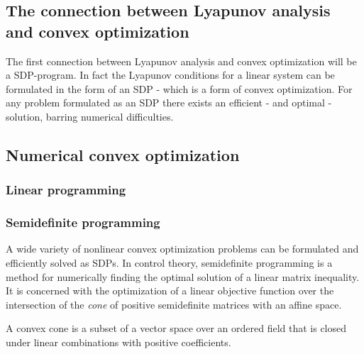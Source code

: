 \subsection{The connection between Lyapunov analysis and convex optimization}

The first connection between Lyapunov analysis and convex optimization will be a
\ac{SDP}-program. In fact the Lyapunov conditions for a linear system can be
formulated in the form of an \ac{SDP} - which is a form of convex optimization.
For any problem formulated as an \ac{SDP} there exists an efficient - and
optimal - solution, barring numerical difficulties.

\subsection{Numerical convex optimization}

\subsubsection{Linear programming}

\subsubsection{Semidefinite programming}

A wide variety of nonlinear convex optimization problems can be formulated and
efficiently solved as \ac{SDP}s. In control theory, semidefinite programming is
a method for numerically finding the optimal solution of a linear matrix
inequality. It is concerned with the optimization of a linear objective function
over the intersection of the \textit{cone} of positive semidefinite matrices
with an affine space.

A convex cone is a subset of a vector space over an ordered field that is closed
under linear combinations with positive coefficients.

